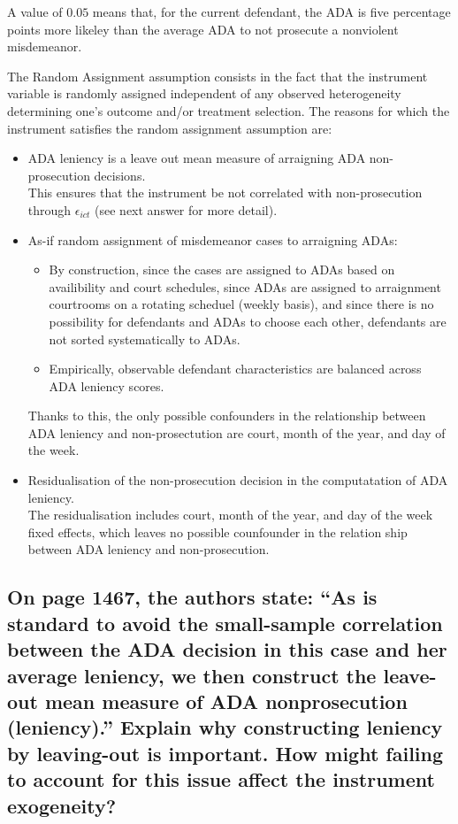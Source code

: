\documentclass{article}
\begin{document}
A value of \(0.05\) means that, for the current defendant, the ADA is five percentage points more likeley than the average ADA to not prosecute a nonviolent misdemeanor.

The Random Assignment assumption consists in the fact that the instrument variable is randomly assigned independent of any observed heterogeneity determining one's outcome and/or treatment selection. The reasons for which the instrument satisfies the random assignment assumption are:
\begin{itemize}
    \item ADA leniency is a leave out mean measure of arraigning ADA non-prosecution decisions.\\
    This ensures that the instrument be not correlated with non-prosecution through \(\epsilon_{ict}\) (see next answer for more detail).
    \item As-if random assignment of misdemeanor cases to arraigning ADAs:
    \begin{itemize}
        \item By construction, since the cases are assigned to ADAs based on availibility and court schedules, since ADAs are assigned to arraignment courtrooms on a rotating scheduel (weekly basis), and since there is no possibility for defendants and ADAs to choose each other, defendants are not sorted systematically to ADAs.
        \item Empirically, observable defendant characteristics are balanced across ADA leniency scores.
    \end{itemize}
    Thanks to this, the only possible confounders in the relationship between ADA leniency and non-prosectution are court, month of the year, and day of the week.
    \item Residualisation of the non-prosecution decision in the computatation of ADA leniency.\\
    The residualisation includes court, month of the year, and day of the week fixed effects, which leaves no possible counfounder in the relation ship between ADA leniency and non-prosecution.
\end{itemize}

\subsection{On page 1467, the authors state: “As is standard to avoid the small-sample correlation between the ADA decision in this case and her average leniency, we then construct the leave-out mean measure of ADA nonprosecution (leniency).” Explain why constructing leniency by leaving-out is important. How might failing to account for this issue affect the instrument exogeneity?}
\end{document}
